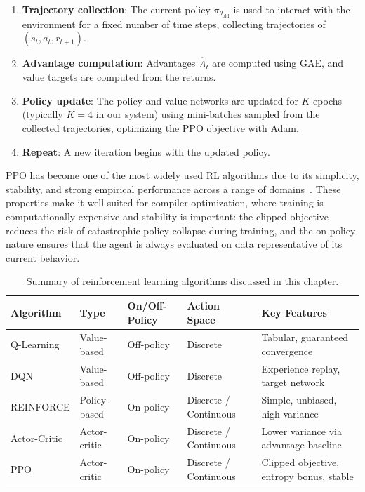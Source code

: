 \begin{enumerate}
    \item \textbf{Trajectory collection}: The current policy $\pi_{\theta_{\text{old}}}$ is used to interact with the environment for a fixed number of time steps, collecting trajectories of $(s_t, a_t, r_{t+1})$.
    \item \textbf{Advantage computation}: Advantages $\hat{A}_t$ are computed using GAE, and value targets are computed from the returns.
    \item \textbf{Policy update}: The policy and value networks are updated for $K$ epochs (typically $K = 4$ in our system) using mini-batches sampled from the collected trajectories, optimizing the PPO objective with Adam.
    \item \textbf{Repeat}: A new iteration begins with the updated policy.
\end{enumerate}

PPO has become one of the most widely used RL algorithms due to its simplicity, stability, and strong empirical performance across a range of domains~\cite{berner2019dota}. These properties make it well-suited for compiler optimization, where training is computationally expensive and stability is important: the clipped objective reduces the risk of catastrophic policy collapse during training, and the on-policy nature ensures that the agent is always evaluated on data representative of its current behavior.

\begin{table}[H]
    \centering
    \caption{Summary of reinforcement learning algorithms discussed in this chapter.}
    \label{tab:rl-algorithms}
    \begin{tabularx}{\textwidth}{l l l l >{\raggedright\arraybackslash}p{4cm}}
        \toprule
        \textbf{Algorithm} & \textbf{Type} & \textbf{On/Off-Policy} & \textbf{Action Space} & \textbf{Key Features} \\
        \midrule
        Q-Learning & Value-based & Off-policy & Discrete & Tabular, guaranteed convergence \\
        \addlinespace
        DQN & Value-based & Off-policy & Discrete & Experience replay, target network \\
        \addlinespace
        REINFORCE & Policy-based & On-policy & Discrete / Continuous & Simple, unbiased, high variance \\
        \addlinespace
        Actor-Critic & Actor-critic & On-policy & Discrete / Continuous & Lower variance via advantage baseline \\
        \addlinespace
        PPO & Actor-critic & On-policy & Discrete / Continuous & Clipped objective, entropy bonus, stable \\
        \bottomrule
    \end{tabularx}
\end{table}

